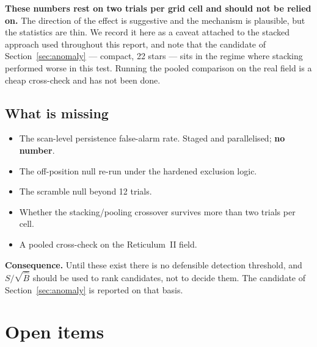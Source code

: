 \documentclass[11pt,a4paper]{article}
\newcommand{\Bhat}{\hat{B}}
\newcommand{\srb}{S/\sqrt{\Bhat}}
\begin{document}
\textbf{These numbers rest on two trials per grid cell and should not be relied on.} The direction
of the effect is suggestive and the mechanism is plausible, but the statistics are thin. We record
it here as a caveat attached to the stacked approach used throughout this report, and note that the
candidate of Section~\ref{sec:anomaly} --- compact, 22 stars --- sits in the regime where stacking
performed worse in this test. Running the pooled comparison on the real field is a cheap
cross-check and has not been done.

\subsection{What is missing}
\label{sec:missing}

\begin{itemize}[nosep,leftmargin=1.4em]
\item The scan-level persistence false-alarm rate. Staged and parallelised; \textbf{no number}.
\item The off-position null re-run under the hardened exclusion logic.
\item The scramble null beyond 12 trials.
\item Whether the stacking/pooling crossover survives more than two trials per cell.
\item A pooled cross-check on the Reticulum~II field.
\end{itemize}

\textbf{Consequence.} Until these exist there is no defensible detection threshold, and $\srb$
should be used to rank candidates, not to decide them. The candidate of Section~\ref{sec:anomaly}
is reported on that basis.

\section{Open items}
\label{sec:open}
\end{document}
